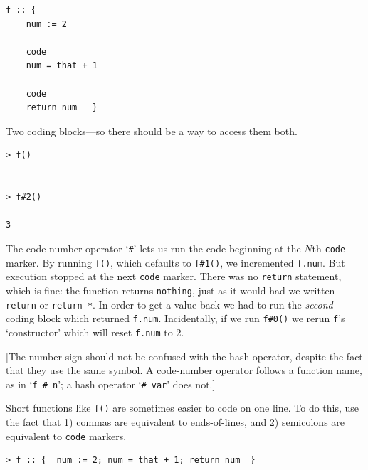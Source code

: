 \documentclass{article}
\newenvironment{code}{
       \begin{list}{}{
               \setlength{\leftmargin}{.4in}
               \setlength{\rightmargin}{0in}
               \setlength{\topsep}{.2in}
       }
       \small
       \item[] }
       { \end{list}   }
\begin{document}
\begin{code} \begin{verbatim}
f :: {
    num := 2
    
    code
    num = that + 1
    
    code
    return num   }
\end{verbatim} \end{code}

\noindent Two coding blocks---so there should be a way to access them both.

\begin{code} \begin{verbatim}
> f()


> f#2()

3
\end{verbatim} \end{code}

\noindent The code-number operator `\verb$#$' lets us run the code beginning at the $N$th \verb#code# marker.  By running \verb$f()$, which defaults to \verb$f#1()$, we incremented \verb#f.num#.  But execution stopped at the next \verb#code# marker.  There was no \verb#return# statement, which is fine:  the function returns \verb#nothing#, just as it would had we written \verb#return# or \verb#return *#.  In order to get a value back we had to run the \emph{second} coding block which returned \verb#f.num#.  Incidentally, if we run \verb$f#0()$ we rerun \verb#f#'s `constructor' which will reset \verb#f.num# to 2.

[The number sign should not be confused with the hash operator, despite the fact that they use the same symbol.  A code-number operator follows a function name, as in  `\verb$f # n$'; a hash operator `\verb$# var$' does not.]

Short functions like \verb#f()# are sometimes easier to code on one line.  To do this, use the fact that 1) commas are equivalent to ends-of-lines, and 2) semicolons are equivalent to \verb#code# markers.

\begin{code} \begin{verbatim}
> f :: {  num := 2; num = that + 1; return num  }
\end{verbatim} \end{code}







\end{document}
